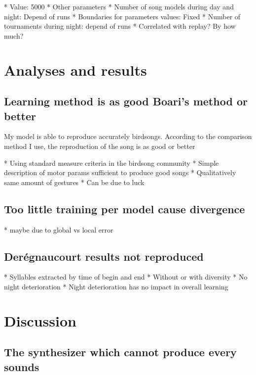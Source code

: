 \documentclass{report}
\begin{document}
        * Value: 5000
      * Other parameters
    * Number of song models during day and night: Depend of runs
  * Boundaries for parameters values: Fixed
  * Number of tournaments during night: depend of runs
        * Correlated with replay? By how much?

\chapter{Analyses and results}\label{analyses-and-results}


\section{Learning method is as good Boari's method or
better}\label{learning-method-is-as-good-boaris-method-or-better}

My model is able to reproduce accurately birdsongs. According to the comparison
method I use, the reproduction of the song is as good or better

  * Using standard measure criteria in the birdsong community
  * Simple description of motor params sufficient to produce good songs
  * Qualitatively same amount of gestures
        * Can be due to luck

  \section{Too little training per model cause
divergence}\label{too-little-training-per-model-cause-divergence}

  * maybe due to global vs local error

\section{Derégnaucourt results not
reproduced}\label{deruxe9gnaucourt-results-not-reproduced}

  * Syllables extracted by time of begin and end
  * Without or with diversity
  * No night deterioration
  * Night deterioration has no impact in overall learning


\chapter{Discussion}\label{discussion}

\section{The synthesizer which cannot produce every
sounds}\label{the-synthesizer-which-cannot-produce-every-sounds}
\end{document}
